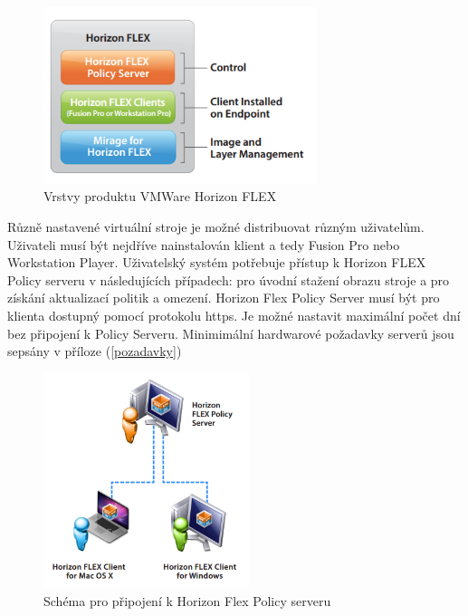  \begin{figure}[h!]\label{FlexVrstvy}
 \centering
\includegraphics[width=8cm]{img/FlexVrstvy}
\caption{Vrstvy produktu VMWare Horizon FLEX} 
\label{FlexVrstvy}
\end{figure}



Různě nastavené virtuální stroje je možné distribuovat různým uživatelům. Uživateli musí být nejdříve nainstalován klient a tedy Fusion Pro nebo Workstation Player. Uživatelský systém potřebuje přístup k Horizon FLEX Policy serveru v následujících případech: pro úvodní stažení obrazu stroje a pro získání aktualizací politik a omezení. Horizon Flex Policy Server musí být pro klienta dostupný pomocí protokolu https. Je možné nastavit maximální počet dní bez připojení k Policy Serveru. Minimimální hardwarové požadavky serverů jsou sepsány v příloze (\ref{pozadavky})


 \begin{figure}[h!]\label{FlexPolicy}
 \centering
\includegraphics[width=6cm]{img/FlexPolicy}
\caption{Schéma pro připojení k Horizon Flex Policy serveru}
\end{figure} 


